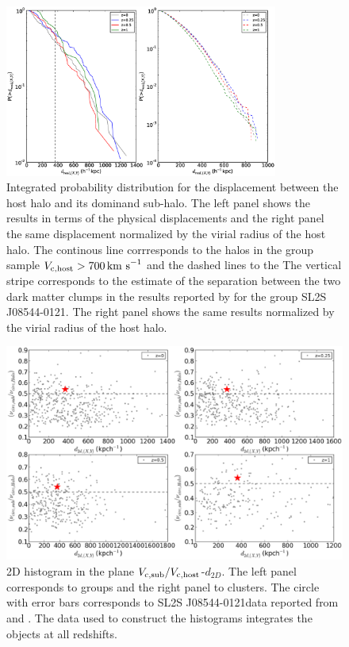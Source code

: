 \documentclass{emulateapj}
\newcommand{\kms}{{\ifmmode{{\mathrm{\,km\ s}^{-1}}}\else{\,km~s$^{-1}$}\fi}}
\newcommand{\bullg}{SL2S J08544-0121}
\begin{document}
\begin{figure}
\begin{center}
\includegraphics[width=0.8\textwidth]{Figures_eps/figure_7_1.eps}
\end{center}
\caption{
Integrated probability distribution for the displacement
  between the host halo and its dominand sub-halo. The left panel
  shows the results in terms of the physical displacements and the
  right panel the same displacement normalized by the virial radius of
  the host halo. The continous line corrresponds to the halos in the
  group sample $V_{\rm c,host}>700\kms$ and the dashed lines to the 
  The vertical stripe corresponds to the estimate of the separation
  between the two dark matter clumps in the results reported by
  \citet{Gastaldello} for the group SL2S J08544-0121. The right panel
  shows the same results normalized by the virial radius of the host
  halo.} 
\label{fig:displacement}
\end{figure}



\begin{figure}
\begin{center}
\includegraphics[width=1.0\textwidth]{Figures_eps/figure_7_2.eps}
\end{center}
\caption{2D histogram in the plane $V_{\rm c,sub}/V_{\rm
    c,host}$-$d_{2D}$. The left panel corresponds to groups and the
  right panel to clusters. The circle with error bars corresponds to
  \bullg data reported from \citet{2013A&A...552A..80M} and
  \citet{Gastaldello}. The data used to construct the histograms
  integrates the objects at all redshifts. }
\label{fig:mass_displacement}
\end{figure}
\end{document}
